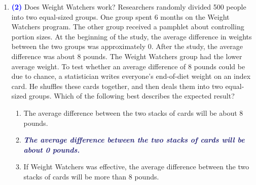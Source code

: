 \documentclass[11pt]{article}
\newcommand{\solnMult}[1]{\textbf{\textcolor{MidnightBlue}{\textit{#1}}}}	%
\newcommand{\pts}[1]{ \textbf{{\footnotesize \textcolor{blue}{(#1)}}} }	%
\begin{document}
\begin{enumerate}
\item \pts{2} Does Weight Watchers work? Researchers randomly divided 500 people into two equal-sized groups. One group spent 6 months on the Weight Watchers program. The other group received a pamphlet about controlling portion sizes. At the beginning of the study, the average difference in weights between the two groups was approximately 0. After the study, the average difference was about 8 pounds. The Weight Watchers group had the lower average weight. To test whether an average difference of 8 pounds could be due to chance, a statistician writes everyone's end-of-diet weight on an index card. He shuffles these cards together, and then deals them into two equal-sized groups. Which of the following best describes the expected result?

\begin{enumerate}
\item The average difference between the two stacks of cards will be about 8 pounds.
\item \solnMult{The average difference between the two stacks of cards will be about 0 pounds.}
\item If Weight Watchers was effective, the average difference between the two stacks of cards will be more than 8 pounds. \\
\end{enumerate}

%

\vspace{2cm}


\end{enumerate}
\end{document}
